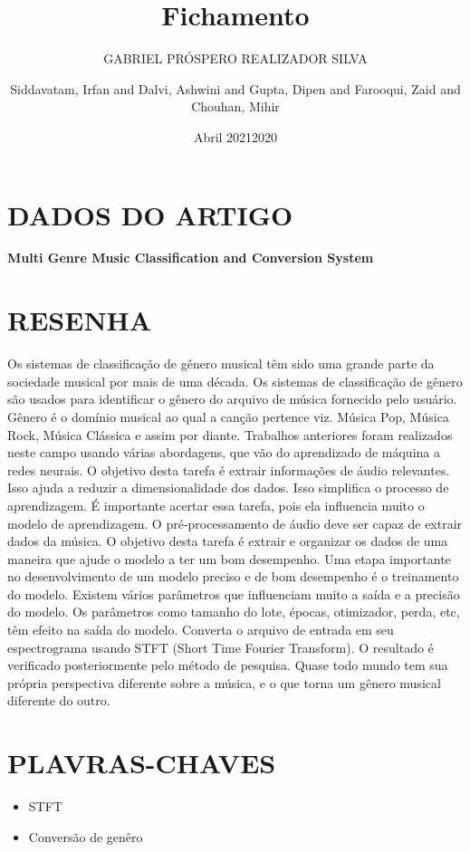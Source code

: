 \documentclass{article}
\title{Fichamento}
\author{GABRIEL PRÓSPERO REALIZADOR  SILVA}
\date{Abril 2021}
\begin{document}
\maketitle

\section{DADOS DO ARTIGO}
\textbf{Multi Genre Music Classification and Conversion System \\}
\author{Siddavatam, Irfan and Dalvi, Ashwini and Gupta, Dipen and Farooqui, Zaid and Chouhan, Mihir \\}
\date{2020}

\section{RESENHA}
Os sistemas de classificação de gênero musical têm sido uma grande parte da sociedade musical por mais de uma década. Os sistemas de classificação de gênero são usados ​​para identificar o gênero do arquivo de música fornecido pelo usuário. Gênero é o domínio musical ao qual a canção pertence viz. Música Pop, Música Rock, Música Clássica e assim por diante. Trabalhos anteriores foram realizados neste campo usando várias abordagens, que vão do aprendizado de máquina a redes neurais.
O objetivo desta tarefa é extrair informações de áudio relevantes. Isso ajuda a reduzir a dimensionalidade dos dados. Isso simplifica o processo de aprendizagem. É importante acertar essa tarefa, pois ela influencia muito o modelo de aprendizagem. O pré-processamento de áudio deve ser capaz de extrair dados da música. O objetivo desta tarefa é extrair e organizar os dados de uma maneira que ajude o modelo a ter um bom desempenho.
Uma etapa importante no desenvolvimento de um modelo preciso e de bom desempenho é o treinamento do modelo. Existem vários parâmetros que influenciam muito a saída e a precisão do modelo. Os parâmetros como tamanho do lote, épocas, otimizador, perda, etc, têm efeito na saída do modelo.
Converta o arquivo de entrada em seu espectrograma usando STFT (Short Time Fourier Transform).
O resultado é verificado posteriormente pelo método de pesquisa. Quase todo mundo tem sua própria perspectiva diferente sobre a música, e o que torna um gênero musical diferente do outro.
\section{PLAVRAS-CHAVES}
\begin{itemize}
    \item STFT
    \item Conversão de genêro
\end{itemize}
\end{document}
